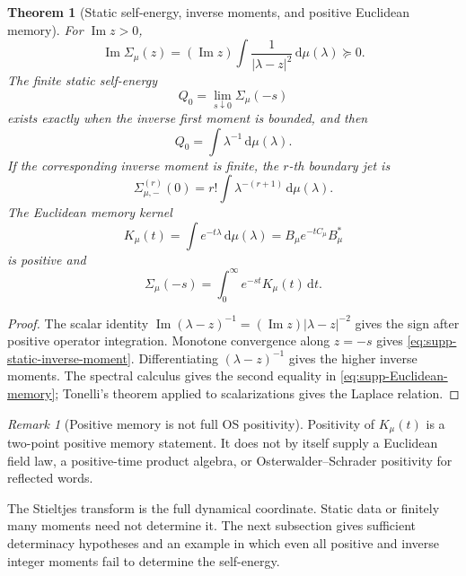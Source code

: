 \documentclass[11pt]{article}
\newtheorem{theorem}{Theorem}[section]
\theoremstyle{definition}
\theoremstyle{remark}
\newtheorem{remark}[remark]{Remark}
\theoremstyle{definition}
\theoremstyle{remark}
\newcommand{\dd}{\mathrm d}
\begin{document}
\begin{theorem}[Static self-energy, inverse moments, and positive Euclidean memory]
\label{thm:supp-dynamic-jets}
For $\operatorname{Im}z>0$,
\begin{equation}
 \operatorname{Im}\Sigma_\mu(z)
 =(\operatorname{Im}z)
  \int\frac{1}{|\lambda-z|^2}\,\dd\mu(\lambda)
 \succeq0.
 \label{eq:supp-Herglotz-sign}
\end{equation}
The finite static self-energy
\[
 Q_0=\lim_{s\downarrow0}\Sigma_\mu(-s)
\]
exists exactly when the inverse first moment is bounded, and then
\begin{equation}
 {Q_0=\int\lambda^{-1}\,\dd\mu(\lambda).}
 \label{eq:supp-static-inverse-moment}
\end{equation}
If the corresponding inverse moment is finite, the $r$-th boundary jet is
\begin{equation}
 {
 \Sigma_{\mu,-}^{(r)}(0)
 =r!\int\lambda^{-(r+1)}\,\dd\mu(\lambda).}
 \label{eq:supp-dynamic-jet}
\end{equation}
The Euclidean memory kernel
\begin{equation}
 {
 K_\mu(t)=\int e^{-t\lambda}\,\dd\mu(\lambda)
 =B_\mu e^{-tC_\mu}B_\mu^*}
 \label{eq:supp-Euclidean-memory}
\end{equation}
is positive and
\[
 \Sigma_\mu(-s)
 =\int_0^\infty e^{-st}K_\mu(t)\,\dd t.
\]
\end{theorem}

\begin{proof}
The scalar identity
$\operatorname{Im}(\lambda-z)^{-1}
=(\operatorname{Im}z)|\lambda-z|^{-2}$ gives the sign after positive
operator integration.  Monotone convergence along $z=-s$ gives
\eqref{eq:supp-static-inverse-moment}.  Differentiating
$(\lambda-z)^{-1}$ gives the higher inverse moments.  The spectral calculus
gives the second equality in \eqref{eq:supp-Euclidean-memory}; Tonelli's
theorem applied to scalarizations gives the Laplace relation.
\end{proof}

\begin{remark}[Positive memory is not full OS positivity]
Positivity of $K_\mu(t)$ is a two-point positive memory statement.  It does not
by itself supply a Euclidean field law, a positive-time product algebra, or
Osterwalder--Schrader positivity for reflected words.
\end{remark}

The Stieltjes transform is the full dynamical coordinate.  Static data or
finitely many moments need not determine it.  The next subsection gives
sufficient determinacy hypotheses and an example in which even all positive
and inverse integer moments fail to determine the self-energy.
\end{document}
